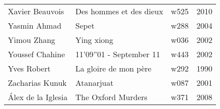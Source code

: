 \documentclass{article}
\begin{document}
\begin {center}
\begin{longtable}{l p{10cm} l l}
Xavier Beauvois & Des hommes et des dieux & w525 & 2010 \\
Yasmin Ahmad & Sepet & w288 & 2004 \\
Yimou Zhang & Ying xiong & w036 & 2002 \\
Youssef Chahine & 11'09''01 - September 11 & w443 & 2002 \\
Yves Robert & La gloire de mon père & w292 & 1990 \\
Zacharias Kunuk & Atanarjuat & w087 & 2001 \\
Álex de la Iglesia & The Oxford Murders & w371 & 2008 \\
\hline
\end{longtable}
\end{center}
\end{document}
